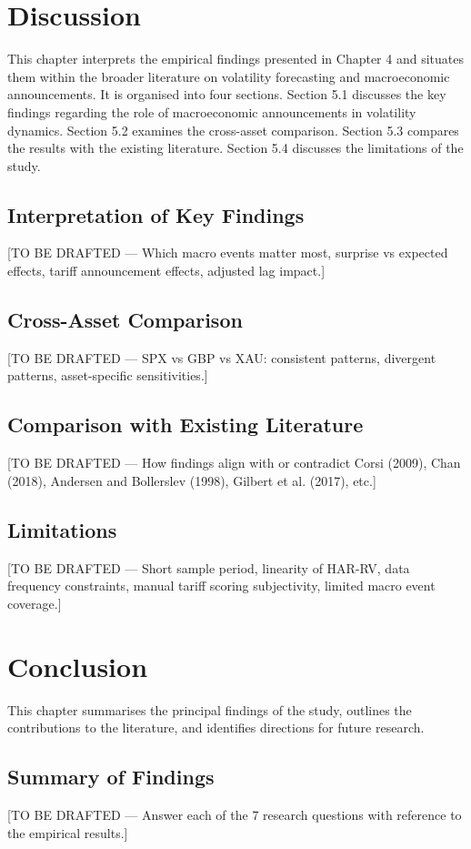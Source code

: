 \documentclass[12pt,a4paper]{report}
\begin{document}
\chapter{Discussion}
This chapter interprets the empirical findings presented in Chapter 4 and situates them within the broader literature on volatility forecasting and macroeconomic announcements. It is organised into four sections. Section 5.1 discusses the key findings regarding the role of macroeconomic announcements in volatility dynamics. Section 5.2 examines the cross-asset comparison. Section 5.3 compares the results with the existing literature. Section 5.4 discusses the limitations of the study.

\section{Interpretation of Key Findings}
[TO BE DRAFTED --- Which macro events matter most, surprise vs expected effects, tariff announcement effects, adjusted lag impact.]

\section{Cross-Asset Comparison}
[TO BE DRAFTED --- SPX vs GBP vs XAU: consistent patterns, divergent patterns, asset-specific sensitivities.]

\section{Comparison with Existing Literature}
[TO BE DRAFTED --- How findings align with or contradict Corsi (2009), Chan (2018), Andersen and Bollerslev (1998), Gilbert et al. (2017), etc.]

\section{Limitations}
[TO BE DRAFTED --- Short sample period, linearity of HAR-RV, data frequency constraints, manual tariff scoring subjectivity, limited macro event coverage.]

\chapter{Conclusion}
This chapter summarises the principal findings of the study, outlines the contributions to the literature, and identifies directions for future research.

\section{Summary of Findings}
[TO BE DRAFTED --- Answer each of the 7 research questions with reference to the empirical results.]
\end{document}
